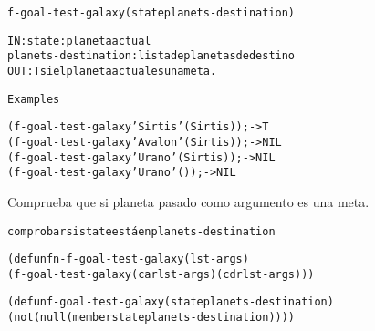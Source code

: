 \begin{aibox}{\function}
\begin{alltt}
f-goal-test-galaxy (state planets-destination) 


IN:     state: planeta actual
        planets-destination: lista de planetas de destino
OUT: T si el planeta actual es una meta.

\end{alltt}
\end{aibox}

\begin{aibox}{\examples}
\begin{alltt}
Examples

(f-goal-test-galaxy 'Sirtis '(Sirtis)) ;-> T 
(f-goal-test-galaxy 'Avalon '(Sirtis)) ;-> NIL 
(f-goal-test-galaxy 'Urano '(Sirtis)) ;-> NIL
(f-goal-test-galaxy 'Urano '()) ;-> NIL


\end{alltt}
\end{aibox}

\begin{aibox}{\comments}
Comprueba que si planeta pasado como argumento es una meta.

\end{aibox}

\begin{aibox}{\pseudocode}
\begin{alltt}

comprobar si state está en planets-destination

\end{alltt}
\end{aibox}

\begin{aibox}{\code}
\begin{alltt}
(defun fn-f-goal-test-galaxy (lst-args)
    (f-goal-test-galaxy (car lst-args) (cdr lst-args)))

(defun f-goal-test-galaxy (state planets-destination) 
  (not (null (member state planets-destination))))




\end{alltt}
\end{aibox}

